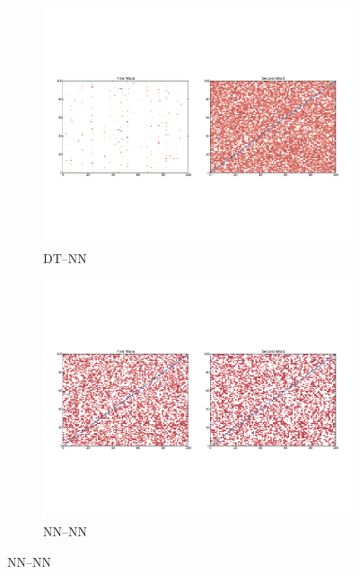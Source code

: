 \documentclass[11pt]{article}
\begin{document}
\begin{figure}[t!]
	\begin{center}
	\begin{subfigure}{\columnwidth}
		\centering
		\includegraphics[width=\columnwidth,keepaspectratio=true]{./dt_nn.pdf}	
		\caption{\small DT--NN}
		\label{fig:dt_nn}			
	\end{subfigure}
	\begin{subfigure}{\columnwidth}
		\centering
		\includegraphics[width=\columnwidth,keepaspectratio=true]{./nn_nn.pdf}		
		\caption {\small NN--NN}
		\label{fig:nn_nn}
	\end{subfigure}
	\end{center}

\end{figure}
\end{document}
